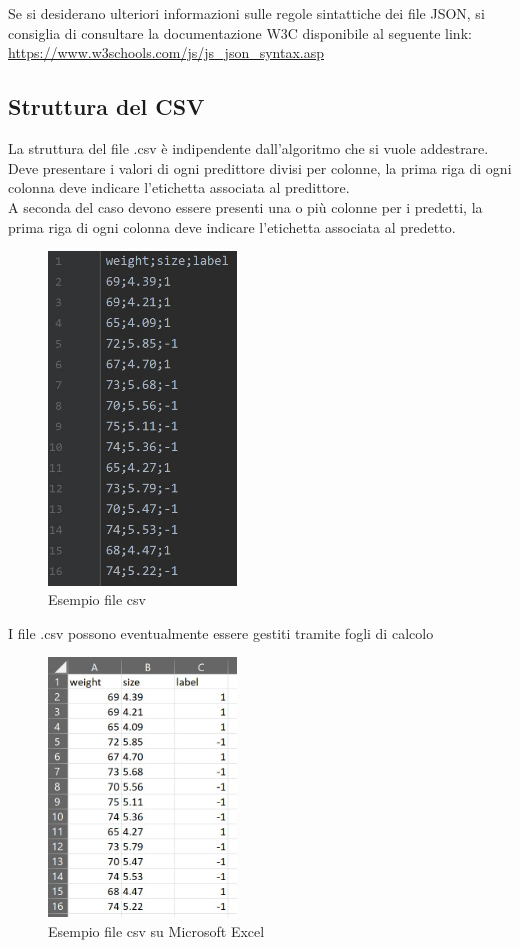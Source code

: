 		\mbox{} \\ \\ 
		Se si desiderano ulteriori informazioni sulle regole sintattiche dei file JSON, si consiglia di consultare la documentazione W3C disponibile al seguente link:
		\\[0.2cm]
		\hspace*{10mm}
		\url{https://www.w3schools.com/js/js_json_syntax.asp}
		
	\subsection{Struttura del CSV}
	La struttura del file .csv è indipendente dall'algoritmo che si vuole addestrare.
	Deve presentare i valori di ogni predittore divisi per colonne, la prima riga di ogni colonna deve indicare l'etichetta associata al predittore. \\
	A seconda del caso devono essere presenti una o più colonne per i predetti, la prima riga di ogni colonna deve indicare l'etichetta associata al predetto.
	\mbox{}
	\begin{figure} [H]
		\begin{center}
			\includegraphics[width=50mm]{./img/csv1.jpg}
		\end{center}
		\caption{Esempio file csv}
	\end{figure}
	\mbox{}
	I file .csv possono eventualmente essere gestiti tramite fogli di calcolo
	\mbox{}
	\begin{figure} [H]
		\begin{center}
			\includegraphics[width=50mm]{./img/csv2.jpg}
		\end{center}
		\caption{Esempio file csv su Microsoft Excel}
	\end{figure}
	\mbox{} 